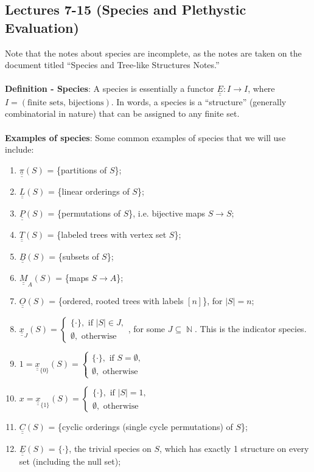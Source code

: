 \documentclass{article}
\DeclareMathOperator{\N}{\mathbb{N}}
\newcommand{\species}[1]{\underline{\underline{#1}}}
\begin{document}
\subsection*{Lectures 7-15 (Species and Plethystic Evaluation)}
Note that the notes about species are incomplete, as the notes are taken on the document titled ``Species and Tree-like Structures Notes.'' \\ \\
\textbf{Definition - Species}: A species is essentially a functor $\species{E}: I \rightarrow I$, where $I = (\text{finite sets, bijections})$. In words, a species is a ``structure'' (generally combinatorial in nature) that can be assigned to any finite set. \\ \\
\textbf{Examples of species}: Some common examples of species that we will use include: \begin{enumerate}
    \item $\species{\pi}(S)$ = \{partitions of $S$\};
    \item $\species{L}(S)$ = \{linear orderings of $S$\};
    \item $\species{P}(S)$ = \{permutations of $S$\}, i.e. bijective maps $S \rightarrow S$;
    \item $\species{T}(S)$ = \{labeled trees with vertex set $S$\};
    \item $\species{B}(S)$ = \{subsets of $S$\};
    \item $\species{M}_A(S)$ = \{maps $S \rightarrow A$\};
    \item $\species{O}(S)$ = \{ordered, rooted trees with labels $[n]$\}, for $|S| = n$;
    \item $\species{x}_J(S) = \begin{cases}
        \{\cdot\}, \text{ if } |S| \in J, \\
        \emptyset, \text{ otherwise}
    \end{cases}$, for some $J \subseteq \N$. This is the indicator species.
    \item $1 = \species{x}_{\{0\}}(S) = \begin{cases}
        \{\cdot\}, \text{ if } S = \emptyset, \\
        \emptyset, \text{ otherwise}
    \end{cases}$
    \item $x = \species{x}_{\{1\}}(S) = \begin{cases}
        \{\cdot\}, \text{ if } |S| = 1, \\
        \emptyset, \text{ otherwise}
    \end{cases}$
    \item $\species{C}(S)$ = \{cyclic orderings (single cycle permutations) of $S$\};
    \item $\species{E}(S)$ = $\{\cdot\}$, the trivial species on $S$, which has exactly 1 structure on every set (including the null set);
\end{enumerate} $ $ \\
\end{document}
